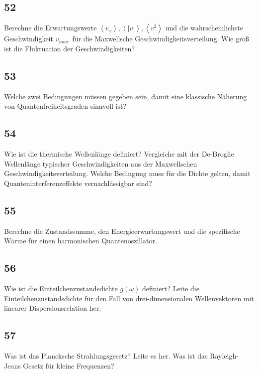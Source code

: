 \documentclass[12pt,a4paper]{report}
\newenvironment{myfrag}{\begin{it}}{\end{it}\vspace{3mm}\par}
\numberwithin{equation}{section}
\begin{document}
\subsection{52}
\newcommand{\vmax}{\ensuremath{v_{max}}}
\begin{myfrag}
Berechne die Erwartungswerte $\left\langle v_x \right\rangle , \left\langle |v| \right\rangle , \left\langle v^2 \right\rangle $ und die wahrscheinlichste
Geschwindigkeit \vmax\, für die Maxwellsche Geschwindigkeitsverteilung. Wie
groß ist die Fluktuation der Geschwindigkeiten?
\end{myfrag}
\subsection{53}
\begin{myfrag}
Welche zwei Bedingungen müssen gegeben sein, damit eine klassische
Näherung von Quantenfreiheitsgraden sinnvoll ist?
\end{myfrag}
\subsection{54}
\begin{myfrag}
Wie ist die thermische Wellenlänge definiert? Vergleiche mit der De-Broglie
Wellenlänge typischer Geschwindigkeiten aus der Maxwellschen
Geschwindigkeitsverteilung. Welche Bedingung muss für die Dichte gelten,
damit Quanteninterferenzeffekte vernachlässigbar sind?
\end{myfrag}
\subsection{55}
\begin{myfrag}
Berechne die Zustandssumme, den Energieerwartungswert und die
spezifische Wärme für einen harmonischen Quantenoszillator.
\end{myfrag}
\subsection{56}
\begin{myfrag}
Wie ist die Einteilchenzustandsdichte $g(\omega )$ definiert? Leite die
Einteilchenzustandsdichte für den Fall von drei-dimensionalen
Wellenvektoren mit linearer Dispersionsrelation her.
\end{myfrag}
\subsection{57}
\begin{myfrag}
Was ist das Plancksche Strahlungsgesetz? Leite es her. Was ist das
Rayleigh-Jeans Gesetz für kleine Frequenzen?
\end{myfrag}
\end{document}
